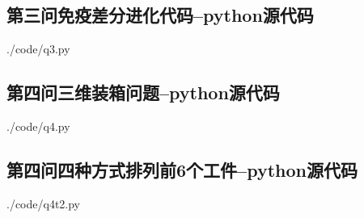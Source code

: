 \documentclass{whutmod}
\begin{document}
			\subsection*{第三问免疫差分进化代码--python源代码}
	 {./code/q3.py}
	
	\subsection*{第四问三维装箱问题--python源代码}
	 {./code/q4.py}
		
		\subsection*{第四问四种方式排列前6个工件--python源代码}
	 {./code/q4t2.py}
	
\end{document}
